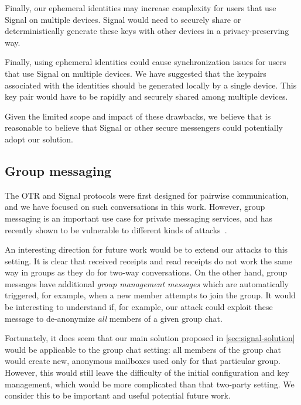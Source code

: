 Finally, our ephemeral identities may increase complexity for users that use
Signal on multiple devices. Signal would need to securely share or deterministically
generate these keys with other devices in a privacy-preserving way.

Finally, using ephemeral identities could cause synchronization issues for users
that use Signal on multiple devices.  We have suggested that the keypairs associated
with the identities should be generated locally by a single device.  This key 
pair would have to be rapidly and securely shared among multiple devices. 
\fi

Given the limited scope and impact of these drawbacks, we believe that is
reasonable to believe that Signal or other secure messengers could potentially
adopt our solution. %


\subsection{Group messaging}
\label{sec:signal-group}


The OTR and Signal protocols were first designed for pairwise
communication, and we have focused on such conversations in this work.
However, group messaging is an important use case for private messaging
services, and has recently shown to be vulnerable to different kinds of
attacks~\cite{RMS18,CCGMM18,SH19}.

An interesting direction for future work would be to extend our attacks
to this setting. It is clear that received receipts and read receipts
do not work the same way in groups as they do for two-way conversations.
On the other hand, group messages have additional \emph{group management
messages} which are automatically triggered, for example, when a new
member attempts to join the group. It would be interesting to understand
if, for example, our attack could exploit these message to de-anonymize
\emph{all} members of a given group chat.

Fortunately, it does seem that our main solution proposed in
\cref{sec:signal-solution} would be applicable to the group chat setting: all
members of the group chat would create new, anonymous mailboxes used
only for that particular group. However, this would still leave the
difficulty of the initial configuration and key management, which would
be more complicated than that two-party setting. We consider this to be
important and useful potential future work.
